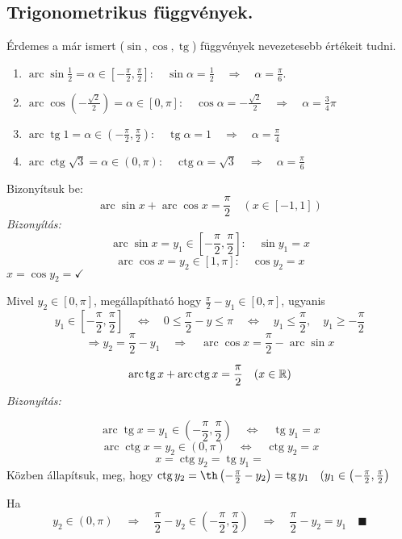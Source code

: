 \documentclass[a4paper,11.5pt]{article}
\DeclareMathOperator{\tg}{tg}
\DeclareMathOperator{\ctg}{ctg}
\DeclareMathOperator{\arc}{arc}
\begin{document}
	\subsection{Trigonometrikus függvények.}
	\begin{note}
		Érdemes a már ismert ($\sin, \cos, \tg$) függvények nevezetesebb értékeit tudni.
	\end{note}
	\begin{task}
		\begin{enumerate}
			\item $\arc\sin\frac{1}{2}=\alpha\in\left[-\frac{\pi}{2},\frac{\pi}{2}\right]:\quad \sin \alpha=\frac{1}{2} \quad \Rightarrow\quad \alpha = \frac{\pi}{6}.$
			\item $\arc\cos\left(-\frac{\sqrt{2}}{2}\right)=\alpha\in[0,\pi]:\quad \cos\alpha=-\frac{\sqrt{2}}{2}\quad \Rightarrow\quad \alpha=\frac{3}{4}\pi$
			\item $\arc\tg1=\alpha\in\left(-\frac{\pi}{2},\frac{\pi}{2}\right):\quad \tg\alpha=1\quad \Rightarrow\quad \alpha = \frac{\pi}{4}$
			\item $\arc\ctg\sqrt{3}=\alpha\in(0,\pi):\quad \ctg\alpha=\sqrt{3}\quad \Rightarrow\quad \alpha=\frac{\pi}{6}$
		\end{enumerate}
	\end{task}
	\begin{task} Bizonyítsuk be:
		\[ \arc\sin x+\arc\cos x=\frac{\pi}{2}\quad (x\in[-1,1]) \]
		\textit{Bizonyítás:}
		\[ \arc\sin x=y_1\in\left[-\frac{\pi}{2},\frac{\pi}{2}\right]:\quad \sin y_1=x \]
		\[ \arc\cos x=y_2\in\left[1,\pi\right]:\quad \cos y_2=x \]
		$x=\cos y_2=$$\checkmark$
		
		Mivel $y_2\in[0,\pi]$, megállapítható hogy $\frac{\pi}{2}-y_1\in[0,\pi]$, ugyanis
		\[y_1\in\left[-\frac{\pi}{2},\frac{\pi}{2}\right]\quad \Leftrightarrow\quad 0\leq \frac{\pi}{2}-y\leq\pi\quad \Leftrightarrow\quad y_1\leq \frac{\pi}{2}, \quad y_1\geq-\frac{\pi}{2} \]
		\[ \Rightarrow y_2=\frac{\pi}{2}-y_1\quad \Rightarrow\quad \arc\cos x=\frac{\pi}{2}-\arc\sin x \]
	\end{task}
	\begin{task}
		\[ \arc\tg x +\arc \ctg x = \frac{\pi}{2}\quad (x\in\R) \]
		\textit{Bizonyítás:}
		
		\[\arc\tg x = y_1\in\left(-\frac{\pi}{2},\frac{\pi}{2}\right)\quad  \Leftrightarrow\quad \tg y_1=x \]
		\[\arc\ctg x = y_2\in\left(0,\pi\right)\quad  \Leftrightarrow\quad \ctg y_2=x \]
		\[ x=\ctg y_2=\tg y_1= \]
		Közben állapítsuk, meg, hogy $\ctg y_2=\th \left(-\frac{\pi}{2}-y_2\right)=\tg y_1\quad (y_1\in\left(-\frac{\pi}{2},\frac{\pi}{2}\right)$
		
		Ha
		\[ y_2\in(0,\pi)\quad \Rightarrow\quad \frac{\pi}{2}-y_2\in\left(-\frac{\pi}{2},\frac{\pi}{2}\right)\quad \Rightarrow\quad \frac{\pi}{2}-y_2=y_1\quad \blacksquare \]
	\end{task}
\end{document}
